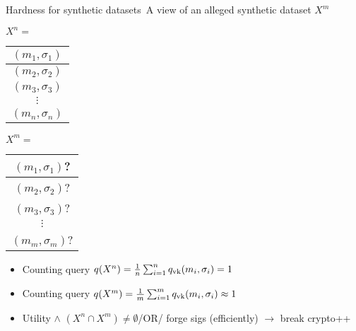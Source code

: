   \begin{frame}{Hardness for synthetic datasets~\cite{conf/stoc/DworkNRRV09}}{A
      view of an alleged synthetic dataset $X^m$}
    \fboxsep=0pt
    \noindent
      \begin{minipage}[l]{0.48\linewidth}

        \begin{center}
          $X^n=$
          \begin{tabular}{ | c | }
            \hline
            $(m_1,\sigma_1)$ \\ \hline
            $(m_2,\sigma_2)$ \\ \hline
            $(m_3,\sigma_3)$ \\ \hline
            $\vdots$ \\ \hline
            $(m_n,\sigma_n)$ \\ \hline
          \end{tabular}
          \end{center}
        
      \end{minipage}%
    \hfill%
      \begin{minipage}[r]{0.48\linewidth}
        \begin{center}
          $X^m=$
          \begin{tabular}{ | c | }
            \hline
            $(m_1,\sigma_1)$? \\ \hline
            $(m_2,\sigma_2)$? \\ \hline
            $(m_3,\sigma_3)$? \\ \hline
            $\vdots$ \\ \hline
            $(m_m,\sigma_m)$? \\ \hline
          \end{tabular}
          \end{center}
      \end{minipage}
      \vspace{1em}
      \begin{itemize}
        \item Counting query $q(X^n) = \frac{1}{n} \sum_{i=1}^n
          q_{\mathrm{vk}}(m_i,\sigma_i) = 1$
          \vspace{1em}
        \item Counting query $q(X^m) = \frac{1}{m} \sum_{i=1}^m
          q_{\mathrm{vk}}(m_i,\sigma_i) \approx 1$
        \vspace{1em}
        \item Utility $\land$ $(X^n \cap X^m) \neq \emptyset$\quad /OR/\quad
          forge sigs (efficiently) $\rightarrow$ break crypto++
        \end{itemize}
\end{frame}



